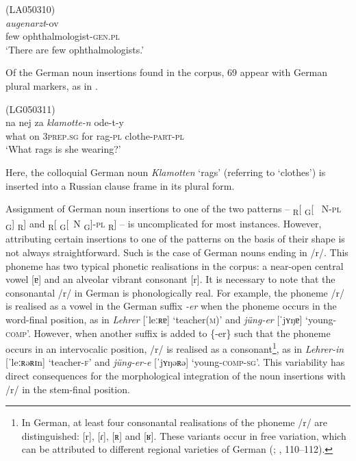 \ea
\label{ex:6:14}
(LA050310)\\
 \textit{augenarzt}{-ov}\\
	few ophthalmologist-\textsc{gen.pl}\\
\glt `There are few ophthalmologists.'
\z

\noindent Of the German noun insertions found in the corpus, 69 appear with German plural markers, as in .

\ea
\label{ex:6:15}
(LG050311)\\
 {na} {nej} {za} \textit{klamotte-n} {ode-t-y}\\
	what on \textsc{3prep.sg} for rag-\textsc{pl} clothe-\textsc{part-pl}\\
\glt `What rags is she wearing?'
\z

\noindent Here, the colloquial German noun \textit{Klamotten} `rags' (referring to `clothes') is inserted into a Russian clause frame in its plural form.

Assignment of German noun insertions to one of the two patterns  --  {\textsubscript{R}[ \textsubscript{G}[~ N-\textsc{pl} \textsubscript{G}] \textsubscript{R}]} and {\textsubscript{R}[ \textsubscript{G}[~N \textsubscript{G}]-\textsc{pl} \textsubscript{R}]}  --  is uncomplicated for most instances. However, attributing certain insertions to one of the patterns on the basis of their shape is not always straightforward. Such is the case of German nouns ending in /r/. This phoneme has two typical phonetic realisations in the corpus: a near-open central vowel [ɐ] and an alveolar vibrant consonant [r]. It is necessary to note that the consonantal /r/ in German is phonologically real. For example, the phoneme /r/ is realised as a vowel in the German suffix \textit{-er} when the phoneme occurs in the word-final position, as in \textit{Lehrer} [ˈleːʀɐ] `teacher(\textsc{m})' and \textit{jüng-er} [ˈjʏŋɐ] `young-\textsc{comp}'. However, when another suffix is added to \{-er\} such that the phoneme occurs in an intervocalic position, /r/ is realised as a consonant\footnote{In German, at least four consonantal realisations of the phoneme /r/ are distinguished: [r], [ɾ], [ʀ] and [ʁ]. These variants occur in free variation, which can be attributed to different regional varieties of German (\citealt[165--166]{kohler95}; \citealt[37--38]{ramers-vater}, 110--112).}, as in \textit{Lehrer-in} [ˈleːʀəʀɪn] `teacher-\textsc{f}' and \textit{jüng-er-e} [ˈjʏŋəʀə] `young-\textsc{comp-sg}'. This variability has direct consequences for the morphological integration of the noun insertions with /r/ in the stem-final position. 

